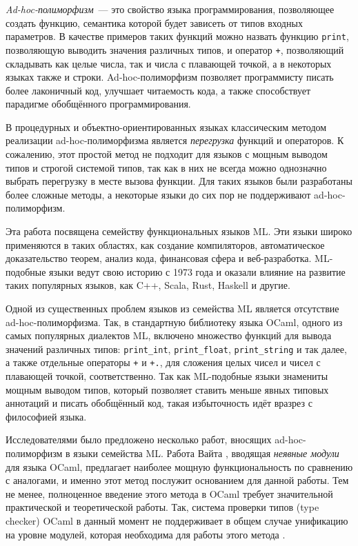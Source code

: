\documentclass[../diploma.tex]{subfiles}
\begin{document}
 \label{sec:introduction}

\textit{Ad-hoc-полиморфизм}~--- это свойство языка программирования, позволяющее создать функцию, семантика которой будет зависеть от типов входных параметров. В качестве примеров таких функций можно назвать функцию \texttt{print}, позволяющую выводить значения различных типов, и оператор \texttt{+}, позволяющий складывать как целые числа, так и числа с плавающей точкой, а в некоторых языках также и строки. Ad-hoc-полиморфизм позволяет программисту писать более лаконичный код, улучшает читаемость кода, а также способствует парадигме обобщённого программирования.

В процедурных и объектно-ориентированных языках классическим методом реализации ad-hoc-полиморфизма является \textit{перегрузка} функций и операторов. К сожалению, этот простой метод не подходит для языков с мощным выводом типов и строгой системой типов, так как в них не всегда можно однозначно выбрать перегрузку в месте вызова функции. Для таких языков были разработаны более сложные методы, а некоторые языки до сих пор не поддерживают ad-hoc-полиморфизм.

Эта работа посвящена семейству функциональных языков ML. Эти языки широко применяются в таких областях, как создание компиляторов, автоматическое доказательство теорем, анализ кода, финансовая сфера и веб-разработка. ML-подобные языки ведут свою историю с 1973 года и оказали влияние на развитие таких популярных языков, как C++, Scala, Rust, Haskell и другие.

Одной из существенных проблем языков из семейства ML является отсутствие ad-hoc-полиморфизма. Так, в стандартную библиотеку языка OCaml, одного из самых популярных диалектов ML, включено множество функций для вывода значений различных типов: \texttt{print\_int}, \texttt{print\_float}, \texttt{print\_string} и так далее, а также отдельные операторы \texttt{+} и \texttt{+.}, для сложения целых чисел и чисел с плавающей точкой, соответственно. Так как ML-подобные языки знамениты мощным выводом типов, который позволяет ставить меньше явных типовых аннотаций и писать обобщённый код, такая избыточность идёт вразрез с философией языка.

Исследователями было предложено несколько работ, вносящих ad-hoc-полиморфизм в языки семейства ML. Работа Вайта \cite{white}, вводящая \textit{неявные модули} для языка OCaml, предлагает наиболее мощную функциональность по сравнению с аналогами, и именно этот метод послужит основанием для данной работы. Тем не менее, полноценное введение этого метода в OCaml требует значительной практической и теоретической работы. Так, система проверки типов (type checker) OCaml в данный момент не поддерживает в общем случае унификацию на уровне модулей, которая необходима для работы этого метода \cite{discuss}.
\end{document}

